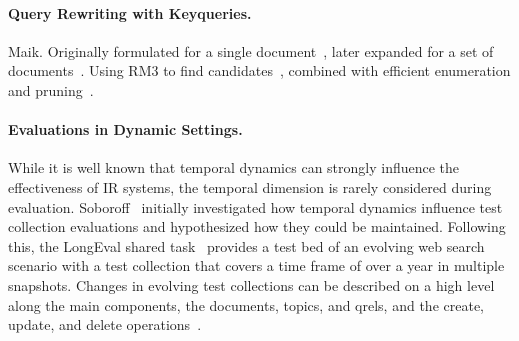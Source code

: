 \paragraph{Query Rewriting with Keyqueries.} {\color{red} Maik.} Originally formulated for a single document~\cite{gollub:2013a}, later expanded for a set of documents~\cite{hagen:2016b}. Using RM3 to find candidates~\cite{froebe:2022d}, combined with efficient enumeration and pruning~\cite{froebe:2021c}.


\paragraph{Evaluations in Dynamic Settings.} While it is well known that temporal dynamics can strongly influence the effectiveness of IR systems, the temporal dimension is rarely considered during evaluation. Soboroff~\cite{DBLP:conf/sigir/Soboroff06} initially investigated how temporal dynamics influence test collection evaluations and hypothesized how they could be maintained. Following this, the LongEval shared task~\cite{DBLP:conf/clef/AlkhalifaBDEAFG24,alkhalifa:2023} provides a test bed of an evolving web search scenario with a test collection that covers a time frame of over a year in multiple snapshots. Changes in evolving test collections can be described on a high level along the main components, the documents, topics, and qrels, and the create, update, and delete operations~\cite{keller:2024}. %
